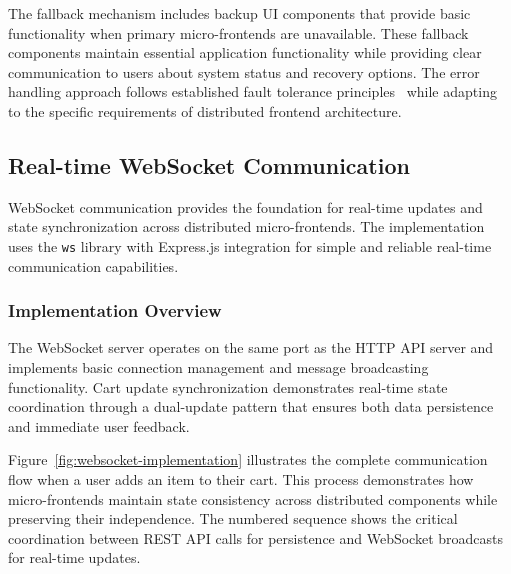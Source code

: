 \documentclass[12pt,a4paper]{report}
\begin{document}
The fallback mechanism includes backup UI components that provide basic functionality when primary micro-frontends are unavailable. These fallback components maintain essential application functionality while providing clear communication to users about system status and recovery options. The error handling approach follows established fault tolerance principles~\cite{avizienis2004basic} while adapting to the specific requirements of distributed frontend architecture.

\subsection{Real-time WebSocket Communication}

WebSocket communication provides the foundation for real-time updates and state synchronization across distributed micro-frontends. The implementation uses the \texttt{ws} library with Express.js integration for simple and reliable real-time communication capabilities.

\subsubsection{Implementation Overview}

The WebSocket server operates on the same port as the HTTP API server and implements basic connection management and message broadcasting functionality. Cart update synchronization demonstrates real-time state coordination through a dual-update pattern that ensures both data persistence and immediate user feedback.

Figure~\ref{fig:websocket-implementation} illustrates the complete communication flow when a user adds an item to their cart. This process demonstrates how micro-frontends maintain state consistency across distributed components while preserving their independence. The numbered sequence shows the critical coordination between REST API calls for persistence and WebSocket broadcasts for real-time updates.
\end{document}
